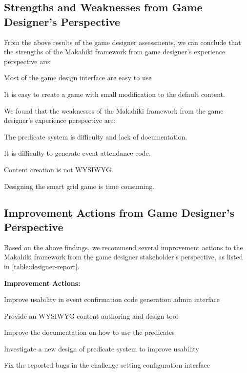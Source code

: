 \subsection{Strengths and Weaknesses from Game Designer's Perspective}
    
From the above results of the game designer assessments, we can conclude that the strengths of the Makahiki framework from game designer's experience perspective are:
    \begin{compactenum}
    \item Most of the game design interface are easy to use 
    \item It is easy to create a game with small modification to the default content.
    \end{compactenum} 

We found that the weaknesses of the Makahiki framework from the game designer's experience perspective are:
    \begin{compactenum}
    \item The predicate system is difficulty and lack of documentation. 
    \item It is difficulty to generate event attendance code.
    \item Content creation is not WYSIWYG.
    \item Designing the smart grid game is time consuming.
    \end{compactenum} 

\subsection{Improvement Actions from Game Designer's Perspective}

Based on the above findings, we recommend several improvement actions to the Makahiki framework from the game designer stakeholder's perspective, as listed in \autoref{table:designer-report}.

\begin{table}[ht!]
\begin{shadebox}
{\bf Improvement Actions:}
\begin{compactenum}
\item Improve usability in event confirmation code generation admin interface
\item Provide an WYSIWYG content authoring and design tool
\item Improve the documentation on how to use the predicates
\item Investigate a new design of predicate system to improve usability
\item Fix the reported bugs in the challenge setting configuration interface  
\end{compactenum}
\end{shadebox}
\caption{SGSEAM Improvement Action Report from Game Designer Stakeholder's Perspective}
\label{table:designer-report}
\end{table}

